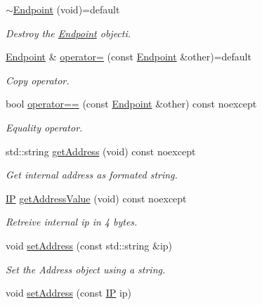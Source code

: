 \begin{DoxyCompactItemize}
\mbox{\hyperlink{classo_z_1_1_endpoint_ae48da5e193017cb119233761406e7d54}{$\sim$\+Endpoint}} (void)=default
\begin{DoxyCompactList}\small\item\em Destroy the \mbox{\hyperlink{classo_z_1_1_endpoint}{Endpoint}} objecti. \end{DoxyCompactList}\item 
\mbox{\hyperlink{classo_z_1_1_endpoint}{Endpoint}} \& \mbox{\hyperlink{classo_z_1_1_endpoint_a196bf4aa01c286bc1cf949cd4b68a175}{operator=}} (const \mbox{\hyperlink{classo_z_1_1_endpoint}{Endpoint}} \&other)=default
\begin{DoxyCompactList}\small\item\em Copy operator. \end{DoxyCompactList}\item 
bool \mbox{\hyperlink{classo_z_1_1_endpoint_ab5a405bf455ab2f4e28458b0ba69d399}{operator==}} (const \mbox{\hyperlink{classo_z_1_1_endpoint}{Endpoint}} \&other) const noexcept
\begin{DoxyCompactList}\small\item\em Equality operator. \end{DoxyCompactList}\item 
std\+::string \mbox{\hyperlink{classo_z_1_1_endpoint_a27a680dbcdf1c89bb10fcbaca969edab}{get\+Address}} (void) const noexcept
\begin{DoxyCompactList}\small\item\em Get internal address as formated string. \end{DoxyCompactList}\item 
\mbox{\hyperlink{namespaceo_z_ace55c2d0182a14ceea9649d0d0cf9c4a}{IP}} \mbox{\hyperlink{classo_z_1_1_endpoint_ad02055ec457231d4d0f316dcfa5539ba}{get\+Address\+Value}} (void) const noexcept
\begin{DoxyCompactList}\small\item\em Retreive internal ip in 4 bytes. \end{DoxyCompactList}\item 
void \mbox{\hyperlink{classo_z_1_1_endpoint_a90caf5f6497ec5a09b34d7a6069502da}{set\+Address}} (const std\+::string \&ip)
\begin{DoxyCompactList}\small\item\em Set the Address object using a string. \end{DoxyCompactList}\item 
void \mbox{\hyperlink{classo_z_1_1_endpoint_ab59c67d8538e05a0bc5192777296d47a}{set\+Address}} (const \mbox{\hyperlink{namespaceo_z_ace55c2d0182a14ceea9649d0d0cf9c4a}{IP}} ip)

\end{DoxyCompactItemize}
